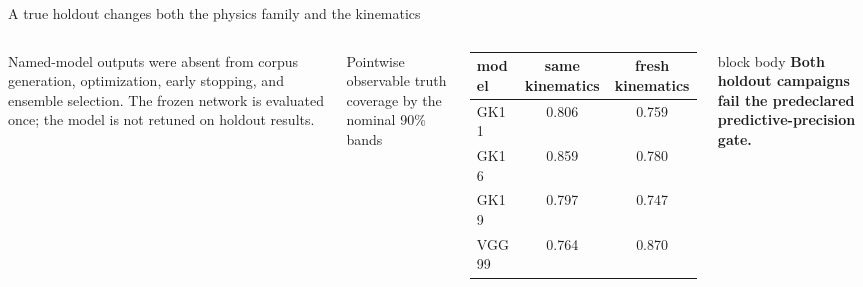 \documentclass[aspectratio=169,10pt]{beamer}
\begin{document}
\begin{frame}{A true holdout changes both the physics family and the kinematics}
\begin{columns}[T,onlytextwidth]
\vspace{2mm}
\small Named-model outputs were absent from corpus generation, optimization,
early stopping, and ensemble selection. The frozen network is evaluated once;
the model is not retuned on holdout results.

\centering
\small Pointwise observable truth coverage by the nominal 90\% bands
\vspace{1mm}
\begin{tabular}{lcc}
\toprule
model & same kinematics & fresh kinematics\\
\midrule
GK11  & 0.806 & 0.759\\
GK16  & 0.859 & 0.780\\
GK19  & 0.797 & 0.747\\
VGG99 & 0.764 & 0.870\\
\bottomrule
\end{tabular}

\vspace{4mm}
\begin{beamercolorbox}[rounded=true,sep=2mm,wd=.93\linewidth]{block body}
\centering\color{red}\bfseries
Both holdout campaigns fail the predeclared predictive-precision gate.
\end{beamercolorbox}
\end{columns}
\end{frame}
\end{document}
